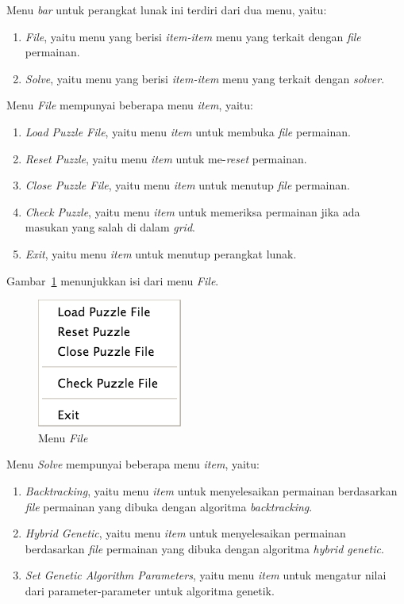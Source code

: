 Menu \textit{bar} untuk perangkat lunak ini terdiri dari dua menu, yaitu:
\begin{enumerate}
\item \textit{File}, yaitu menu yang berisi \textit{item-item} menu yang terkait dengan \textit{file} permainan.
\item \textit{Solve}, yaitu menu yang berisi \textit{item-item} menu yang terkait dengan \textit{solver}.
\end{enumerate}


Menu \textit{File} mempunyai beberapa menu \textit{item}, yaitu:
\begin{enumerate}
\item \textit{Load Puzzle File}, yaitu menu \textit{item} untuk membuka \textit{file} permainan.
\item \textit{Reset Puzzle}, yaitu menu \textit{item} untuk me-\textit{reset} permainan.
\item \textit{Close Puzzle File}, yaitu menu \textit{item} untuk menutup \textit{file} permainan.
\item \textit{Check Puzzle}, yaitu menu \textit{item} untuk memeriksa permainan jika ada masukan yang salah di dalam \textit{grid}.
\item \textit{Exit}, yaitu menu \textit{item} untuk menutup perangkat lunak.
\end{enumerate}

Gambar~\ref{fig:perancanganguimenufile} menunjukkan isi dari menu \textit{File}.

\begin{figure}
\centering
\captionsetup{justification=centering}
\includegraphics[scale=0.5]{Gambar/Perancangan/PerancanganGUIMenuFile.png}
\caption[Menu \textit{File}]{Menu \textit{File}}
\label{fig:perancanganguimenufile}
\end{figure}

Menu \textit{Solve} mempunyai beberapa menu \textit{item}, yaitu:
\begin{enumerate}
\item \textit{Backtracking}, yaitu menu \textit{item} untuk menyelesaikan permainan berdasarkan \textit{file} permainan yang dibuka dengan algoritma \textit{backtracking}.
\item \textit{Hybrid Genetic}, yaitu menu \textit{item} untuk menyelesaikan permainan berdasarkan \textit{file} permainan yang dibuka dengan algoritma \textit{hybrid genetic}.
\item \textit{Set Genetic Algorithm Parameters}, yaitu menu \textit{item} untuk mengatur nilai dari parameter-parameter untuk algoritma genetik.
\end{enumerate}

